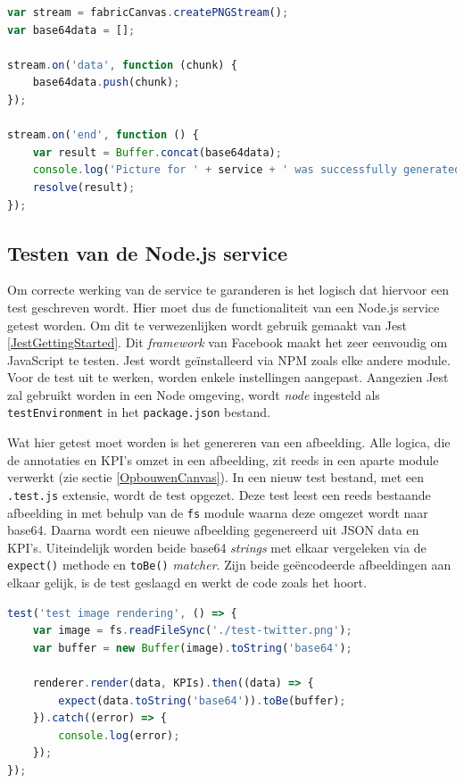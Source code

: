\begin{lstlisting}[caption={renderer.js - aanmaken van base64},label=lst:Base64Generation,language=javascript]
var stream = fabricCanvas.createPNGStream();
var base64data = [];

stream.on('data', function (chunk) {
	base64data.push(chunk);
});

stream.on('end', function () {
	var result = Buffer.concat(base64data);
	console.log('Picture for ' + service + ' was successfully generated');
	resolve(result);
});
\end{lstlisting}

\subsection{Testen van de Node.js service}
Om correcte werking van de service te garanderen is het logisch dat hiervoor een test geschreven wordt. Hier moet dus de functionaliteit van een Node.js service getest worden. Om dit te verwezenlijken wordt gebruik gemaakt van Jest \ref{JestGettingStarted}. Dit \textit{framework} van Facebook maakt het zeer eenvoudig om JavaScript te testen. Jest wordt ge\"{i}nstalleerd via NPM zoals elke andere module. Voor de test uit te werken, worden enkele instellingen aangepast. Aangezien Jest zal gebruikt worden in een Node omgeving, wordt \textit{node} ingesteld als \texttt{testEnvironment} in het \texttt{package.json} bestand. 

Wat hier getest moet worden is het genereren van een afbeelding. Alle logica, die de annotaties en KPI's omzet in een afbeelding, zit reeds in een aparte module verwerkt (zie sectie \ref{OpbouwenCanvas}). In een nieuw test bestand, met een \texttt{.test.js} extensie, wordt de test opgezet. Deze test leest een reeds bestaande afbeelding in met behulp van de \texttt{fs} module waarna deze omgezet wordt naar base64. Daarna wordt een nieuwe afbeelding gegenereerd uit JSON data en KPI's. Uiteindelijk worden beide base64 \textit{strings} met elkaar vergeleken via de \texttt{expect()} methode en \texttt{toBe()} \textit{matcher}. Zijn beide ge\"{e}ncodeerde afbeeldingen aan elkaar gelijk, is de test geslaagd en werkt de code zoals het hoort. 

\begin{lstlisting}[caption={render.test.js - Testen van de service},label=lst:RenderTest,language=javascript]
test('test image rendering', () => {
	var image = fs.readFileSync('./test-twitter.png');
	var buffer = new Buffer(image).toString('base64');
	
	renderer.render(data, KPIs).then((data) => {
		expect(data.toString('base64')).toBe(buffer);
	}).catch((error) => {
		console.log(error);
	});
});
\end{lstlisting}

